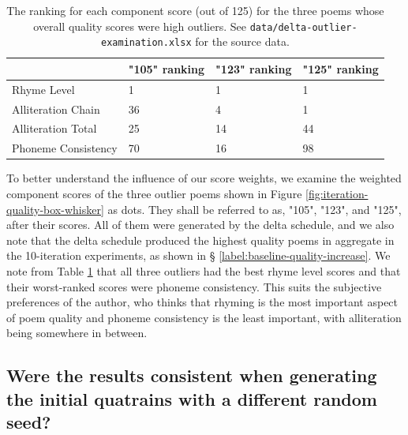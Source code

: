 \documentclass[a4paper,10pt]{article}
\begin{document}
\begin{table}[htb!]
    \centering
    \begin{tabular}{|l|l|l|l|}
    \hline
        & "105" ranking & "123" ranking & "125" ranking \\ \hline
        Rhyme Level & 1 & 1 & 1 \\ \hline
        Alliteration Chain & 36 & 4 & 1 \\ \hline
        Alliteration Total & 25 & 14 & 44 \\ \hline
        Phoneme Consistency & 70 & 16 & 98 \\ \hline
    \end{tabular}
    \caption{The ranking for each component score (out of 125) for the three poems whose overall quality scores were high outliers. See \texttt{data/delta-outlier-examination.xlsx} for the source data.}
    \label{tab:delta-outlier-examination}
\end{table}

To better understand the influence of our score weights, we examine the weighted component scores of the three outlier poems shown in Figure \ref{fig:iteration-quality-box-whisker} as dots. They shall be referred to as, "105", "123", and "125", after their scores. All of them were generated by the delta schedule, and we also note that the delta schedule produced the highest quality poems in aggregate in the 10-iteration experiments, as shown in § \ref{label:baseline-quality-increase}. We note from Table \ref{tab:delta-outlier-examination} that all three outliers had the best rhyme level scores and that their worst-ranked scores were phoneme consistency. This suits the subjective preferences of the author, who thinks that rhyming is the most important aspect of poem quality and phoneme consistency is the least important, with alliteration being somewhere in between.

\subsection{Were the results consistent when generating the initial quatrains with a different random seed?}
\label{ssec:random-seed-comparison}
\end{document}
